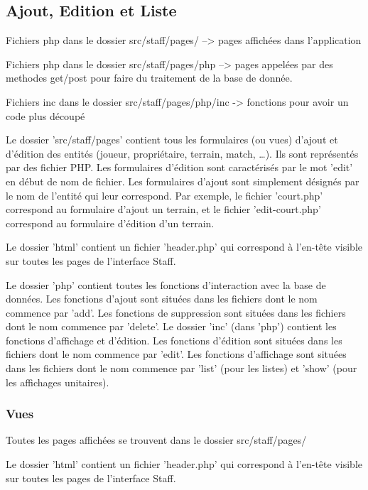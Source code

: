 \documentclass{article}
\begin{document}
\subsection{Ajout, Edition et Liste}

Fichiers php dans le dossier src/staff/pages/ –> pages affichées dans l'application

Fichiers php dans le dossier src/staff/pages/php –> pages appelées par des methodes get/post pour faire du traitement de la base de donnée.

Fichiers inc dans le dossier src/staff/pages/php/inc -> fonctions pour avoir un code plus découpé

Le dossier 'src/staff/pages' contient tous les formulaires (ou vues) d'ajout et d'édition des entités (joueur, propriétaire, terrain, match, …). Ils sont représentés par des fichier PHP. Les formulaires d'édition sont caractérisés par le mot 'edit' en début de nom de fichier. Les formulaires d'ajout sont simplement désignés par le nom de l'entité qui leur correspond. Par exemple, le fichier 'court.php' correspond au formulaire d'ajout un terrain, et le fichier 'edit-court.php' correspond au formulaire d'édition d'un terrain.

Le dossier 'html' contient un fichier 'header.php' qui correspond à l'en-tête visible sur toutes les pages de l'interface Staff.

Le dossier 'php' contient toutes les fonctions d'interaction avec la base de données. Les fonctions d'ajout sont situées dans les fichiers dont le nom commence par 'add'. Les fonctions de suppression sont situées dans les fichiers dont le nom commence par 'delete'.
Le dossier 'inc' (dans 'php') contient les fonctions d'affichage et d'édition. Les fonctions d'édition sont situées dans les fichiers dont le nom commence par 'edit'. Les fonctions d'affichage sont situées dans les fichiers dont le nom commence par 'list' (pour les listes) et 'show' (pour les affichages unitaires).


\subsubsection{Vues}

Toutes les pages affichées se trouvent dans le dossier src/staff/pages/

Le dossier 'html' contient un fichier 'header.php' qui correspond à l'en-tête visible sur toutes les pages de l'interface Staff.

\end{document}
